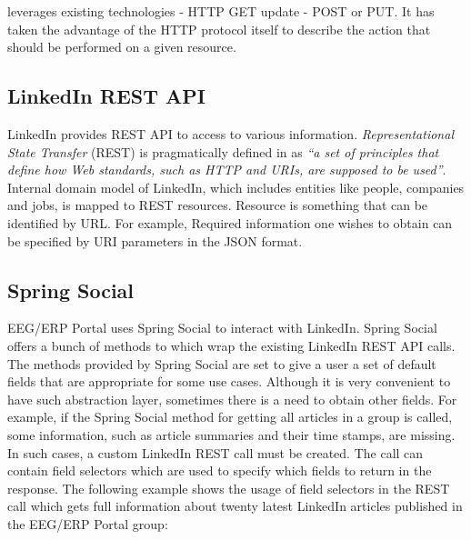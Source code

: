 \documentclass[12pt, oneside, a4paper]{book}
\begin{document}
leverages existing technologies - HTTP GET update - POST or PUT. It has taken the advantage of the HTTP protocol itself to describe the action that should be performed on a given resource.

\subsection{LinkedIn REST API}

LinkedIn provides REST API to access to various information. \textit{Representational State Transfer} (REST) is pragmatically defined in \cite{REST:Introduction} as \textit{``a set of principles that define how Web standards, such as HTTP and URIs, are supposed to be used''}.
Internal domain model of LinkedIn, which includes entities like people, companies and jobs, is mapped to REST resources. Resource is something that can be identified by URL. For example, 	
Required information one wishes to obtain can be specified by URI parameters in the JSON format. 

\subsection{Spring Social}

EEG/ERP Portal uses Spring Social to interact with LinkedIn. 
Spring Social offers a bunch of methods to which wrap the existing LinkedIn REST API calls. 
The methods provided by Spring Social are set to give a user a set of default fields that are appropriate for some use cases. 
Although it is very convenient to have such abstraction layer, sometimes there is a need to obtain other fields. 
For example, if the Spring Social method for getting all articles in a group is called, some information, such as article summaries and their time stamps, are missing. 
In such cases, a custom LinkedIn REST call must be created.
The call can contain field selectors which are used to specify which fields to return in the response.
The following example shows the usage of field selectors in the REST call which gets full information about twenty latest LinkedIn articles published in the EEG/ERP Portal group:

\end{document}
